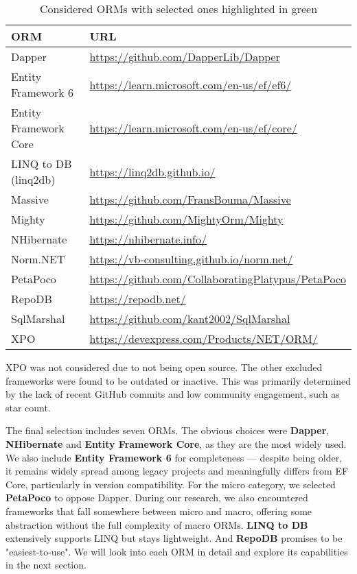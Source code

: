 \begin{table}[h]
\centering
\begin{tabular}{|l|l|}
\hline
\textbf{ORM} & \textbf{URL} \\
\hline
\cellcolor{lightgreen}Dapper & \url{https://github.com/DapperLib/Dapper} \\
\cellcolor{lightgreen}Entity Framework 6 & \url{https://learn.microsoft.com/en-us/ef/ef6/} \\
\cellcolor{lightgreen}Entity Framework Core & \url{https://learn.microsoft.com/en-us/ef/core/} \\
\cellcolor{lightgreen}LINQ to DB (linq2db) & \url{https://linq2db.github.io/} \\
Massive & \url{https://github.com/FransBouma/Massive} \\
Mighty & \url{https://github.com/MightyOrm/Mighty} \\
\cellcolor{lightgreen}NHibernate & \url{https://nhibernate.info/} \\
Norm.NET & \url{https://vb-consulting.github.io/norm.net/} \\
\cellcolor{lightgreen}PetaPoco & \url{https://github.com/CollaboratingPlatypus/PetaPoco} \\
\cellcolor{lightgreen}RepoDB & \url{https://repodb.net/} \\
SqlMarshal & \url{https://github.com/kant2002/SqlMarshal} \\
XPO & \url{https://devexpress.com/Products/NET/ORM/} \\
\hline
\end{tabular}
\caption{Considered ORMs with selected ones highlighted in green\label{tab:orm-docs}}
\end{table}

XPO was not considered due to not being open source. The other excluded frameworks were found to be outdated or inactive. This was primarily determined by the lack of recent GitHub commits and low community engagement, such as star count. 

The final selection includes seven ORMs. The obvious choices were \textbf{Dapper}, \textbf{NHibernate} and \textbf{Entity Framework Core}, as they are the most widely used. We also include \textbf{Entity Framework 6} for completeness --- despite being older, it remains widely spread among legacy projects and meaningfully differs from EF Core, particularly in version compatibility. For the micro category, we selected \textbf{PetaPoco} to oppose Dapper. During our research, we also encountered frameworks that fall somewhere between micro and macro, offering some abstraction without the full complexity of macro ORMs. \textbf{LINQ to DB} extensively supports LINQ but stays lightweight. And \textbf{RepoDB} promises to be "easiest-to-use"\cite{RepoDB}. We will look into each ORM in detail and explore its capabilities in the next section.
